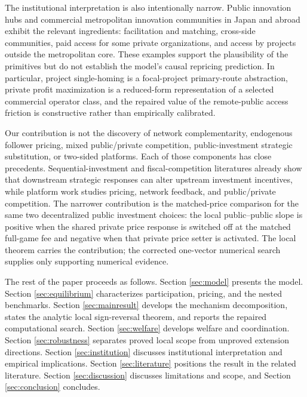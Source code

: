 The institutional interpretation is also intentionally narrow. Public innovation hubs and commercial metropolitan innovation communities in Japan and abroad exhibit the relevant ingredients: facilitation and matching, cross-side communities, paid access for some private organizations, and access by projects outside the metropolitan core. These examples support the plausibility of the primitives but do not establish the model's causal repricing prediction. In particular, project single-homing is a focal-project primary-route abstraction, private profit maximization is a reduced-form representation of a selected commercial operator class, and the repaired value of the remote-public access friction is constructive rather than empirically calibrated.

Our contribution is not the discovery of network complementarity, endogenous follower pricing, mixed public/private competition, public-investment strategic substitution, or two-sided platforms. Each of those components has close precedents. Sequential-investment and fiscal-competition literatures already show that downstream strategic responses can alter upstream investment incentives, while platform work studies pricing, network feedback, and public/private competition. The narrower contribution is the matched-price comparison for the same two decentralized public investment choices: the local public--public slope is positive when the shared private price response is switched off at the matched full-game fee and negative when that private price setter is activated. The local theorem carries the contribution; the corrected one-vector numerical search supplies only supporting numerical evidence.

The rest of the paper proceeds as follows. Section \ref{sec:model} presents the model. Section \ref{sec:equilibrium} characterizes participation, pricing, and the nested benchmarks. Section \ref{sec:mainresult} develops the mechanism decomposition, states the analytic local sign-reversal theorem, and reports the repaired computational search. Section \ref{sec:welfare} develops welfare and coordination. Section \ref{sec:robustness} separates proved local scope from unproved extension directions. Section \ref{sec:institution} discusses institutional interpretation and empirical implications. Section \ref{sec:literature} positions the result in the related literature. Section \ref{sec:discussion} discusses limitations and scope, and Section \ref{sec:conclusion} concludes.
